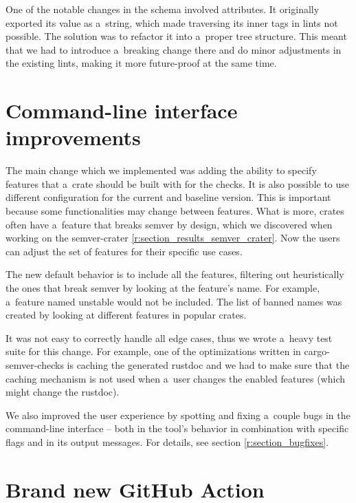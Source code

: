 \documentclass[licencjacka,en]{pracamgr}
\begin{document}
One of the notable changes in the schema involved attributes.
It originally exported its value as a~string, which made traversing
its inner tags in lints not possible.
The solution was to refactor it into a~proper tree structure.
This meant that we had to introduce a~breaking change there
and do minor adjustments in the existing lints,
making it more future-proof at the same time.

\section{Command-line interface improvements}\label{r:section_cli}

The main change which we implemented was adding the ability to specify
features that a~crate should be built with for the checks. It is also
possible to use different configuration for the current and baseline version.
This is important because some functionalities may change between features. What is more,
crates often have a~feature that breaks semver by design, which
we discovered when working on the semver-crater \ref{r:section_results_semver_crater}.
Now the users can adjust the set of features for their specific use cases.

The new default behavior is to include all the features,
filtering out heuristically the ones that break semver by looking at
the feature's name. For example, a~feature named {\ttfamily unstable} would not be
included. The list of banned names was created by looking
at different features in popular crates.

It was not easy to correctly handle all edge cases,
thus we wrote a~heavy test suite for this change.
For example, one of the optimizations written in cargo-semver-checks
is caching the generated rustdoc and we had to make sure that
the caching mechanism is not used when a~user changes the enabled features
(which might change the rustdoc).

We also improved the user experience by spotting and fixing a~couple bugs
in the command-line interface -- both in the tool's behavior
in combination with specific flags and in its output messages.
For details, see section \ref{r:section_bugfixes}.

\section{Brand new GitHub Action}\label{r:section_github_action}
\end{document}
